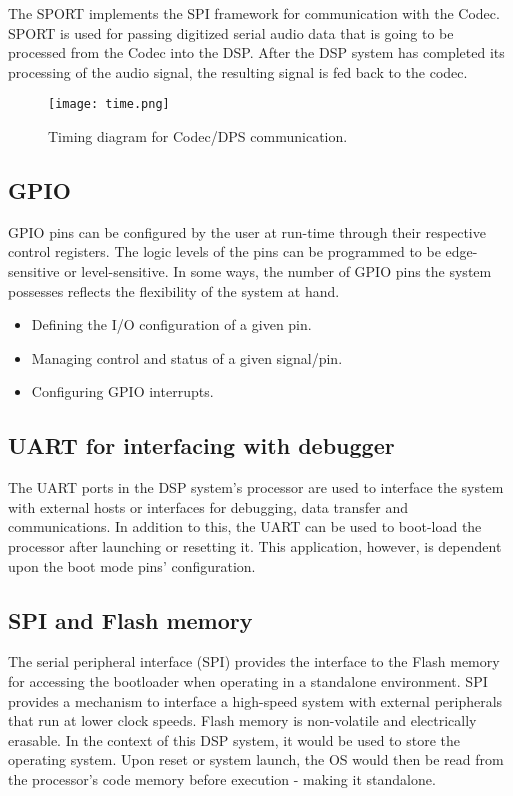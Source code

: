 The SPORT implements the SPI framework for communication with the Codec. SPORT is used for passing digitized serial audio data that is going to be processed from the Codec into the DSP. After the DSP system has completed its processing of the audio signal, the resulting signal is fed back to the codec. 


\begin{figure}[h!]
	\centering
	\texttt{[image: time.png]}
	\caption{Timing diagram for Codec/DPS communication.}
	\label{fig:timing}
\end{figure}




\subsection{GPIO}
GPIO pins can be configured by the user at run-time through their respective control registers. The logic levels of the pins can be programmed to be edge-sensitive or level-sensitive. In some ways, the number of GPIO pins the system possesses reflects the flexibility of the system at hand. 


\begin{itemize}
	\setlength\itemsep{0.1em}
	\item Defining the I/O configuration of a given pin. 
	\item Managing control and status of a given signal/pin. 
	\item Configuring GPIO interrupts. 
\end{itemize}




\subsection{UART for interfacing with debugger}

The UART ports in the DSP system’s processor are used to interface the system with external hosts or interfaces for debugging, data transfer and communications. In addition to this, the UART can be used to boot-load the processor after launching or resetting it. This application, however, is dependent upon the boot mode pins’ configuration. 

\subsection{SPI and Flash memory}

The serial peripheral interface (SPI) provides the interface to the Flash memory for accessing the bootloader when operating in a standalone environment. SPI provides a mechanism to interface a high-speed system with external peripherals that run at lower clock speeds. Flash memory is non-volatile and electrically erasable. In the context of this DSP system, it would be used to store the operating system. Upon reset or system launch, the OS would then be read from the processor’s code memory before execution - making it standalone. 


